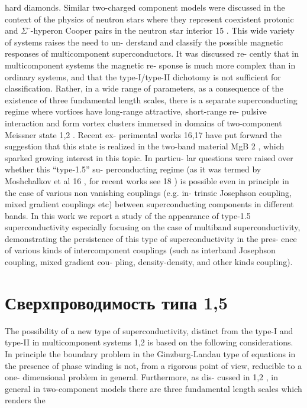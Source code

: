 hard diamonds. Similar two-charged component models
were discussed in the context of the physics of neutron
stars where they represent coexistent protonic and \( \Sigma^\text{--} \)-hyperon Cooper pairs in the neutron star interior 15 .
This wide variety of systems raises the need to un-
derstand and classify the possible magnetic responses of
multicomponent superconductors. It was discussed re-
cently that in multicomponent systems the magnetic re-
sponse is much more complex than in ordinary systems,
and that the type-I/type-II dichotomy is not sufficient
for classification. Rather, in a wide range of parameters,
as a consequence of the existence of three fundamental
length scales, there is a separate superconducting regime
where vortices have long-range attractive, short-range re-
pulsive interaction and form vortex clusters immersed in
domains of two-component Meissner state 1,2 . Recent ex-
perimental works 16,17 have put forward the suggestion
that this state is realized in the two-band material MgB 2 ,
which sparked growing interest in this topic. In particu-
lar questions were raised over whether this “type-1.5” su-
perconducting regime (as it was termed by Moshchalkov
et al 16 , for recent works see 18 ) is possible even in principle
in the case of various non vanishing couplings (e.g. in-
trinsic Josephson coupling, mixed gradient couplings etc)
between superconducting components in different bands.
In this work we report a study of the appearance
of type-1.5 superconductivity especially focusing on the
case of multiband superconductivity, demonstrating the
persistence of this type of superconductivity in the pres-
ence of various kinds of intercomponent couplings (such
as interband Josephson coupling, mixed gradient cou-
pling, density-density, and other kinds coupling).

\section{Сверхпроводимость типа 1,5}
\label{sec:1-1}

The possibility of a new type of superconductivity,
distinct from the type-I and type-II in multicomponent
systems 1,2 is based on the following considerations. In
principle the boundary problem in the Ginzburg-Landau
type of equations in the presence of phase winding is
not, from a rigorous point of view, reducible to a one-
dimensional problem in general. Furthermore, as dis-
cussed in 1,2 , in general in two-component models there
are three fundamental length scales which renders the

